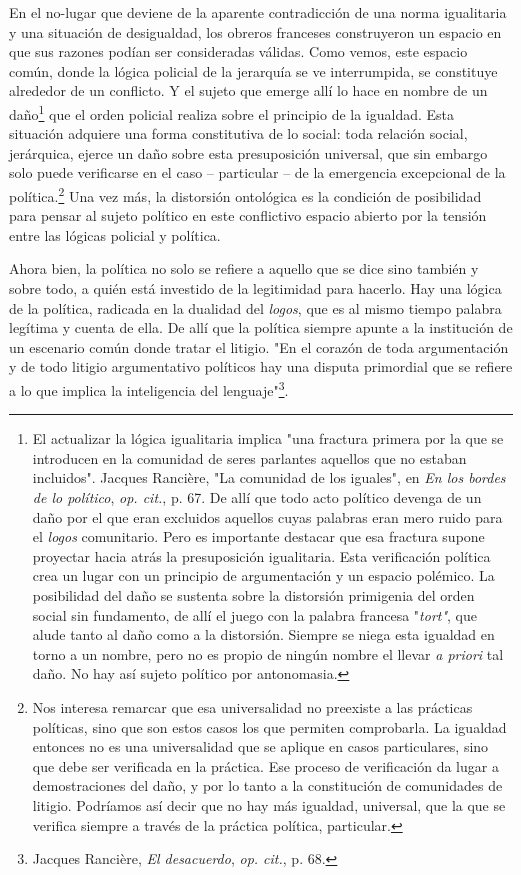 \documentclass{book}
\begin{document}
En el no-lugar que deviene de la aparente contradicción de una norma
igualitaria y una situación de desigualdad, los obreros franceses
construyeron un espacio en que sus razones podían ser consideradas
válidas. Como vemos, este espacio común, donde la lógica policial de la
jerarquía se ve interrumpida, se constituye alrededor de un conflicto. Y
el sujeto que emerge allí lo hace en nombre de un daño\footnote{El
  actualizar la lógica igualitaria implica "una fractura primera por la
  que se introducen en la comunidad de seres parlantes aquellos que no
  estaban incluidos". Jacques Rancière, "La comunidad de los iguales",
  en \emph{En los bordes de lo político}, \emph{op. cit.}, p. 67. De
  allí que todo acto político devenga de un daño por el que eran
  excluidos aquellos cuyas palabras eran mero ruido para el \emph{logos}
  comunitario. Pero es importante destacar que esa fractura supone
  proyectar hacia atrás la presuposición igualitaria. Esta verificación
  política crea un lugar con un principio de argumentación y un espacio
  polémico. La posibilidad del daño se sustenta sobre la distorsión
  primigenia del orden social sin fundamento, de allí el juego con la
  palabra francesa "\emph{tort"}, que alude tanto al daño como a la
  distorsión. Siempre se niega esta igualdad en torno a un nombre, pero
  no es propio de ningún nombre el llevar \emph{a priori} tal daño. No
  hay así sujeto político por antonomasia.} que el orden policial
realiza sobre el principio de la igualdad. Esta situación adquiere una
forma constitutiva de lo social: toda relación social, jerárquica,
ejerce un daño sobre esta presuposición universal, que sin embargo solo
puede verificarse en el caso -- particular -- de la emergencia
excepcional de la política.\footnote{Nos interesa remarcar que esa
  universalidad no preexiste a las prácticas políticas, sino que son
  estos casos los que permiten comprobarla. La igualdad entonces no es
  una universalidad que se aplique en casos particulares, sino que debe
  ser verificada en la práctica. Ese proceso de verificación da lugar a
  demostraciones del daño, y por lo tanto a la constitución de
  comunidades de litigio. Podríamos así decir que no hay más igualdad,
  universal, que la que se verifica siempre a través de la práctica
  política, particular.} Una vez más, la distorsión ontológica es la
condición de posibilidad para pensar al sujeto político en este
conflictivo espacio abierto por la tensión entre las lógicas policial y
política.

Ahora bien, la política no solo se refiere a aquello que se dice sino
también y sobre todo, a quién está investido de la legitimidad para
hacerlo. Hay una lógica de la política, radicada en la dualidad del
\emph{logos}, que es al mismo tiempo palabra legítima y cuenta de ella.
De allí que la política siempre apunte a la institución de un escenario
común donde tratar el litigio. "En el corazón de toda argumentación y de
todo litigio argumentativo políticos hay una disputa primordial que se
refiere a lo que implica la inteligencia del lenguaje"\footnote{Jacques
  Rancière, \emph{El desacuerdo}, \emph{op. cit.}, p. 68.}.
\end{document}
